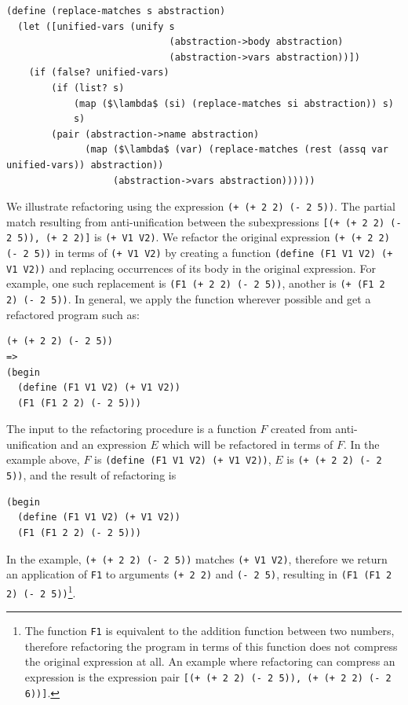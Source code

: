 \documentclass[a4paper,10pt]{article}
\begin{document}
\begin{lstlisting}[frame=trbl]
(define (replace-matches s abstraction)
  (let ([unified-vars (unify s
                             (abstraction->body abstraction)
                             (abstraction->vars abstraction))])
    (if (false? unified-vars)
        (if (list? s)
            (map ($\lambda$ (si) (replace-matches si abstraction)) s)
            s)
        (pair (abstraction->name abstraction)
              (map ($\lambda$ (var) (replace-matches (rest (assq var unified-vars)) abstraction))
                   (abstraction->vars abstraction))))))
\end{lstlisting}
We illustrate refactoring using the expression \texttt{(+ (+ 2 2) (- 2 5))}. The partial match resulting from anti-unification between the subexpressions \texttt{[(+ (+ 2 2) (- 2 5)), (+ 2 2)]} is \texttt{(+ V1 V2)}.  We refactor the original expression \texttt{(+ (+ 2 2) (- 2 5))} in terms of \texttt{(+ V1 V2)} by creating a function \texttt{(define (F1 V1 V2) (+ V1 V2))} and replacing occurrences of its body in the original expression.  For example, one such replacement is \texttt{(F1 (+ 2 2) (- 2 5))}, another is \texttt{(+ (F1 2 2) (- 2 5))}.  In general, we apply the function wherever possible and get a refactored program such as:
\begin{lstlisting}
(+ (+ 2 2) (- 2 5))
=>
(begin
  (define (F1 V1 V2) (+ V1 V2))
  (F1 (F1 2 2) (- 2 5)))
\end{lstlisting}
The input to the refactoring procedure is a function $F$ created from anti-unification and an expression $E$ which will be refactored in terms of $F$.  In the example above, $F$ is \texttt{(define (F1 V1 V2) (+ V1 V2))}, $E$ is \texttt{(+ (+ 2 2) (- 2 5))}, and the result of refactoring is
\begin{lstlisting}
(begin
  (define (F1 V1 V2) (+ V1 V2))
  (F1 (F1 2 2) (- 2 5)))
\end{lstlisting}

In the example, \texttt{(+ (+ 2 2) (- 2 5))} matches \texttt{(+ V1 V2)}, therefore we return an application of \texttt{F1} to arguments \texttt{(+ 2 2)} and \texttt{(- 2 5)}, resulting in \texttt{(F1 (F1 2 2) (- 2 5))}\footnote{The function \texttt{F1} is equivalent to the addition function between two numbers, therefore refactoring the program in terms of this function does not compress the original expression at all.  An example where refactoring can compress an expression is the expression pair \texttt{[(+ (+ 2 2) (- 2 5)), (+ (+ 2 2) (- 2 6))]}.}.
\end{document}
